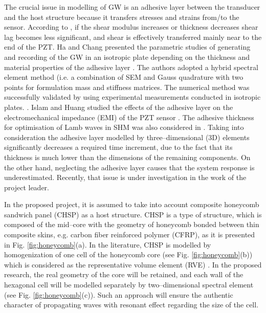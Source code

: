 \documentclass[a4paper,12pt]{article}
\begin{document}
The crucial issue in modelling of GW is an adhesive layer between the transducer and the host structure because it transfers stresses and strains from/to the sensor. According to \cite{crawley1987use}, if the shear modulus increases or thickness decreases shear lag becomes less significant, and shear is effectively transferred mainly near to the end of the PZT. Ha and Chang presented the parametric studies of generating and recording of the GW in an isotropic plate depending on the thickness and material properties of the adhesive layer \cite{ha2010adhesive}. The authors adopted a hybrid spectral element method (i.e. a combination of SEM and Gauss quadrature with two points for formulation mass and stiffness matrices. The numerical method was successfully validated by using experimental measurements conducted in isotropic plates. \cite{ha2009optimizing}. Islam and Huang studied the effects of the adhesive layer on the electromechanical impedance (EMI) of the PZT sensor \cite{islam2014understanding}. The adhesive thickness for optimisation of Lamb waves in SHM was also considered in \cite{willberg2015simulation, islam2016effects}. Taking into consideration the adhesive layer modelled by three--dimensional (3D) elements significantly decreases a required time increment, due to the fact that its thickness is much lower than the dimensions of the remaining components. On the other hand, neglecting the adhesive layer causes that the system response is underestimated. Recently, that issue is under investigation in the work of the project leader.

In the proposed project, it is assumed to take into account composite honeycomb sandwich panel (CHSP) as a host structure. CHSP is a type of structure, which is composed of the mid--core with the geometry of honeycomb bonded between thin composite skins, e.g. carbon fiber reinforced polymer (CFRP), as it is presented in Fig. \ref{fig:honeycomb}(a). In the literature, CHSP is modelled by homogenization of one cell of the honeycomb core (see Fig. \ref{fig:honeycomb}(b)) which is considered as the representative volume element (RVE) \cite{hosseini2013numerical, catapano2014multi, schaal2018core}. In the proposed research, the real geometry of the core will be retained, and each wall of the hexagonal cell will be modelled separately by two--dimensional spectral element (see Fig. \ref{fig:honeycomb}(c)). Such an approach will ensure the authentic character of propagating waves with resonant effect regarding the size of the cell.
\end{document}
